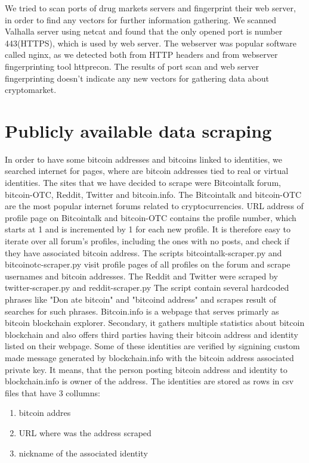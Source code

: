 \documentclass[
  digital, %
  table,   %
  lof,     %
  lot,     %
  oneside
]{fithesis3}
\begin{document}
We tried to scan ports of drug markets servers and fingerprint their web server,
in order to find any vectors for further information gathering.
We scanned Valhalla server using netcat and found that the only opened port is number 443(HTTPS),
which is used by web server. The webserver was popular software called nginx, as we detected
both from HTTP headers and from webserver fingerprinting tool httprecon.
The results of port scan and web server fingerprinting doesn't indicate
any new vectors for gathering data about cryptomarket.

\section{Publicly available data scraping}

In order to have some bitcoin addresses and bitcoins linked to identities,
we searched internet for pages, where are bitcoin addresses tied to real or virtual identities.
The sites that we have decided to scrape were Bitcointalk forum, bitcoin-OTC, Reddit,
Twitter and bitcoin.info.
The Bitcointalk and bitcoin-OTC are the most popular internet forums
related to cryptocurrencies. URL address of profile page on Bitcointalk
and bitcoin-OTC contains the profile number, which starts at 1 and is  incremented by 1
for each new profile. 
It is therefore easy to iterate over all forum's profiles,
including the ones with no posts, and check if they have associated bitcoin address.
The scripts bitcointalk-scraper.py and bitcoinotc-scraper.py
visit profile pages of all profiles on the forum and scrape usernames and bitcoin addresses. 
The Reddit and Twitter were scraped by twitter-scraper.py and reddit-scraper.py
The script contain several hardcoded phrases like "Don
ate bitcoin" and "bitcoind address" and scrapes 
result of searches for such phrases.
Bitcoin.info is a webpage that serves primarly as bitcoin blockchain explorer. Secondary,
it gathers multiple statistics about bitcoin blockchain and also offers
third parties having their bitcoin address and identity listed on their webpage.
Some of these identities are verified by signining
custom made message generated by blockchain.info
with the bitcoin address associated private key. It means, that the person
posting bitcoin address and identity to blockchain.info is owner of the address.
The identities are stored as rows in csv files that have 3 collumns:

\begin{enumerate}
 \item bitcoin addres
 \item URL where was the address scraped
 \item nickname of the associated identity
\end{enumerate}
\end{document}
